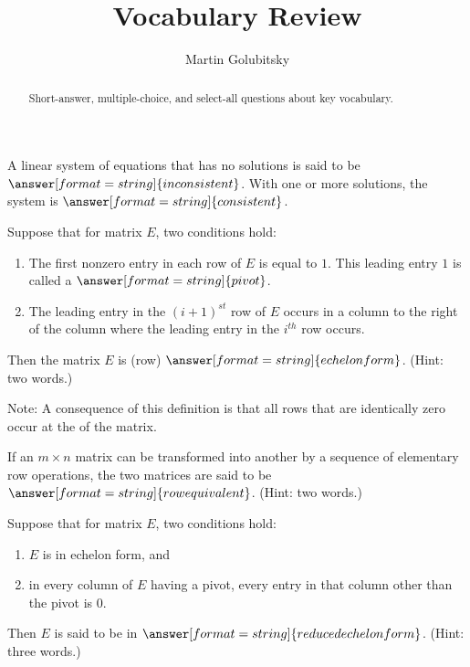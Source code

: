 \documentclass[nooutcomes]{ximera}
\title{Vocabulary Review}
\author{Martin Golubitsky}
\begin{document}
\begin{abstract}
Short-answer, multiple-choice, and select-all questions about key vocabulary. 
\end{abstract}
\maketitle

%

\begin{question}
A linear system of equations that has no solutions is said to be $\answer[format=string]{inconsistent}$.  With one or more solutions, the system is $\answer[format=string]{consistent}$. 
\end{question} 

\begin{question}
Suppose that for matrix $E$, two conditions hold:
\begin{enumerate}
\item The first nonzero entry in each row of $E$ is equal to $1$. This leading entry $1$ is called a 
$\answer[format=string]{pivot}$.
\item The leading entry in the $(i + 1)^{st}$ row of $E$ occurs in a column to the right of the column where the leading entry in the $i^{th}$ row occurs.
\end{enumerate}
Then the matrix $E$ is (row) $\answer[format=string]{echelon form}$.  (Hint: two words.)

Note: A consequence of this definition is that all rows that are identically zero occur at the  of the matrix.
\end{question} 

\begin{question}
If an $m \times n$ matrix can be transformed into another by a sequence of elementary row operations, the two matrices are said to be $\answer[format=string]{row equivalent}$.  (Hint: two words.)
\end{question} 

\begin{question}
Suppose that for matrix $E$, two conditions hold:
\begin{enumerate}
\item $E$ is in echelon form, and
\item in every column of $E$ having a pivot, every entry in that column other than the pivot is $0$.
\end{enumerate}
Then $E$ is said to be in $\answer[format=string]{reduced echelon form}$.  (Hint: three words.) 
\end{question} 
\end{document}
